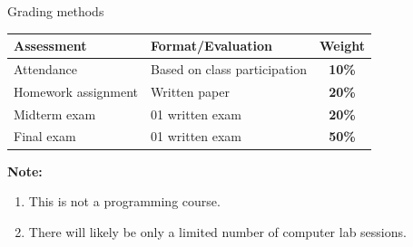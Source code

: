 \documentclass[aspectratio=169]{beamer}
\begin{document}
\begin{frame}{Grading methods}
  \begin{center}
    \begin{tabular}{p{}p{}c}
      \toprule
      \textbf{Assessment} & \textbf{Format/Evaluation} & \textbf{Weight} \\
      \midrule
      Attendance & Based on class participation & \textbf{10\%} \\
      \addlinespace
      Homework assignment & Written paper & \textbf{20\%} \\
      \addlinespace
      Midterm exam & 01 written exam & \textbf{20\%} \\
      \addlinespace
      Final exam & 01 written exam & \textbf{50\%} \\
      \bottomrule
    \end{tabular}
  \end{center}

  {\color{red} \bf Note:}
  \begin{enumerate}
    \item This is not a programming course.
    \item There will likely be only a limited number of computer lab sessions.
  \end{enumerate}
\end{frame}
\end{document}
